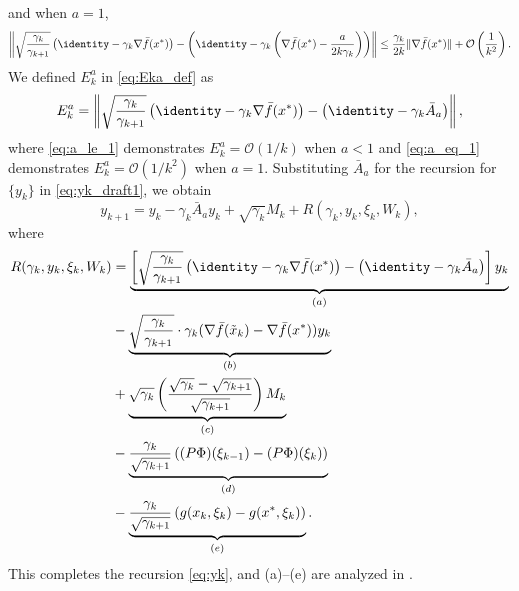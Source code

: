 \documentclass[11pt]{article}
\begin{document}
and when $a = 1$,
\begin{equation}\label{eq:a_eq_1}
    \left\lVert 
    \sqrt{\frac{\gamma_k}{\gamma_{k+1}}} \left(\identity - \gamma_k \nabla \bar{f}(x^*)\right) 
    - 
    \left( \identity - \gamma_k \left(\nabla \bar{f}(x^*) - \frac{a}{2k \gamma_k} \right) \right)
    \right\rVert 
    \leq \frac{\gamma_k}{2k} \lVert \nabla \bar{f}(x^*) \rVert + \mathcal{O}\left(\frac{1}{k^2}\right) .    
\end{equation}
We defined $E_k^a$ in \eqref{eq:Eka_def} as
\begin{align*}
     E_k^a = \left\lVert \sqrt{\frac{\gamma_k}{\gamma_{k+1}}} \left( \identity - \gamma_k \nabla \bar{f}(x^*) \right) - \left(\identity - \gamma_k \bar{A}_a \right) \right\rVert     ,
\end{align*}
where \eqref{eq:a_le_1} demonstrates $E_k^a = \mathcal{O}(1/k)$ when $a < 1$ and \eqref{eq:a_eq_1} demonstrates $E_k^a = \mathcal{O}(1/k^2)$ when $a = 1$.
Substituting $\bar{A}_a$ for the recursion for $\{y_k\}$ in \eqref{eq:yk_draft1}, we obtain 
\begin{equation}
    y_{k+1} = y_k - \gamma_k \bar{A}_a y_k + \sqrt{\gamma_k} M_k + R(\gamma_k, y_k, \xi_k, W_k)    ,
\end{equation}
where
\begin{equation}\label{eq:Rk}
\begin{split}
    R(\gamma_k, y_k, \xi_k, W_k)
    &    
    = 
    \underbrace{\left[ 
    \sqrt{\frac{\gamma_k}{\gamma_{k+1}}}
    \left(\identity - \gamma_k \nabla \bar{f}(x^*) \right)
    - \left( 
    \identity - \gamma_k \bar{A}_a
    \right)
     \right]y_k }_{(a)}
    \\ &
    - \underbrace{\sqrt{\frac{\gamma_k}{\gamma_{k+1}}} \cdot \gamma_k (\nabla \bar{f}(\tilde{x}_k) - \nabla \bar{f}(x^*)) y_k}_{(b)}
    \\ &
    + \underbrace{\sqrt{\gamma_k} \left(\frac{\sqrt{\gamma_k} - \sqrt{\gamma_{k+1}}}{\sqrt{\gamma_{k+1}}} \right)M_k}_{(c)}  
    \\ &
    - \underbrace{\frac{\gamma_k}{\sqrt{\gamma_{k+1}}} 
    \left((P\Phi)(\xi_{k-1}) - (P\Phi)(\xi_{k})\right) }_{(d)} 
    \\ &
    - \underbrace{\frac{\gamma_k}{\sqrt{\gamma_{k+1}}} \left(g(x_k, \xi_k) - g(x^*, \xi_k)\right)}_{(e)}
    . 
\end{split}
\end{equation}
This completes the recursion \eqref{eq:yk}, and (a)--(e) are analyzed in . 
\end{document}
